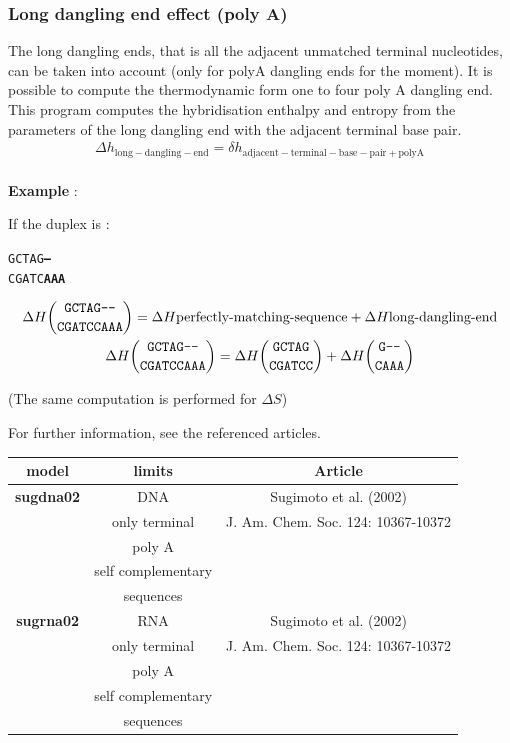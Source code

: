 \documentclass{article}
\begin{document}
\pagebreak
\subsubsection{Long dangling end effect (poly A)}

The long dangling ends, that is all the adjacent unmatched terminal nucleotides, can be taken into
account (only for polyA dangling ends for the moment). It is possible to compute the thermodynamic 
form one to four poly A dangling end. This program computes the hybridisation enthalpy 
and entropy from the parameters of the long dangling end with the adjacent terminal base pair.  
\begin{multline*}
\Delta{}h_\mathrm{long-dangling-end} =
\delta{}h_\mathrm{adjacent-terminal-base-pair+polyA} \\ 
\end{multline*}

\textbf{Example} :

If the duplex is :
\begin{alltt}
GCTAG\textbf{---}
CGATC\textbf{AAA}
\end{alltt}
\begin{multline*}
\Delta H {\mbox{\texttt{GCTAG---}} \choose \mbox{\texttt{CGATCCAAA}}} =
\Delta H {\mbox{perfectly-matching-sequence}} +
\Delta H {\mbox{long-dangling-end}} \\
\Delta H {\mbox{\texttt{GCTAG---}} \choose \mbox{\texttt{CGATCCAAA}}} =
\Delta H {\mbox{\texttt{GCTAG}} \choose \mbox{\texttt{CGATCC}}} +
\Delta H {\mbox{\texttt{G---}} \choose \mbox{\texttt{CAAA}}} \\
\end{multline*}

       (The same computation is performed for $\Delta S$)

For further information, see the referenced articles.

\begin{table}[h][c]
\begin{tabular}[h]{| c | c | c |}
\textbf{model} & \textbf{limits} & \textbf{Article} \\
\hline
\textbf{sugdna02} & DNA & Sugimoto et al. (2002)\\
 & only terminal & J. Am. Chem. Soc. 124: 10367-10372 \\
 & poly A & \\
 & self complementary & \\
 & sequences & \\
 \hline
\textbf{sugrna02} & RNA & Sugimoto et al. (2002)\\
 & only terminal & J. Am. Chem. Soc. 124: 10367-10372 \\
 & poly A & \\
 & self complementary & \\
 & sequences & \\
 \hline
\end{tabular}
\end{table}
\end{document}
